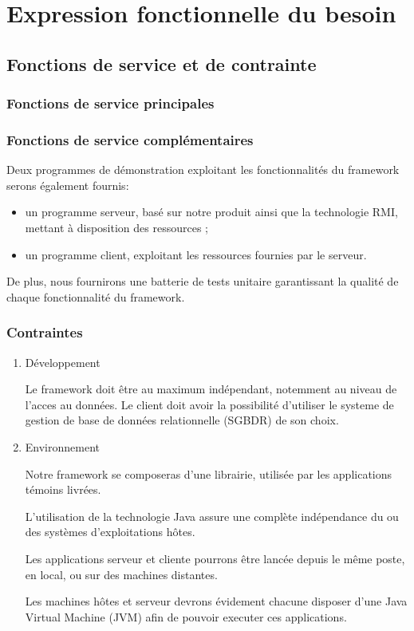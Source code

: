 \section{Expression fonctionnelle du besoin}

\subsection{Fonctions de service et de contrainte}
\subsubsection{Fonctions de service principales}

\subsubsection{Fonctions de service complémentaires}
Deux programmes de démonstration exploitant les fonctionnalités du framework serons également
fournis:
\begin{itemize}
 \item un programme serveur, basé sur notre produit ainsi que la technologie RMI, mettant à disposition des ressources ;
 \item un programme client, exploitant les ressources fournies par le serveur. 
\end{itemize}

De plus, nous fournirons une batterie de tests unitaire garantissant la qualité de chaque fonctionnalité du framework.
\subsubsection{Contraintes}
\begin{enumerate}
 \item Développement

Le framework doit être au maximum indépendant, notemment au niveau de l'acces au données.
Le client doit avoir la possibilité d'utiliser le systeme de gestion de base de données relationnelle (SGBDR) de son choix.

 \item Environnement

Notre framework se composeras d'une librairie, utilisée par les applications témoins livrées.

L'utilisation de la technologie Java assure une complète indépendance du ou des systèmes d'exploitations hôtes.

Les applications serveur et cliente pourrons être lancée depuis le même poste, en local, ou sur des machines distantes.

Les machines hôtes et serveur devrons évidement chacune disposer d'une Java Virtual Machine (JVM) afin de pouvoir executer ces applications.

\end{enumerate}

